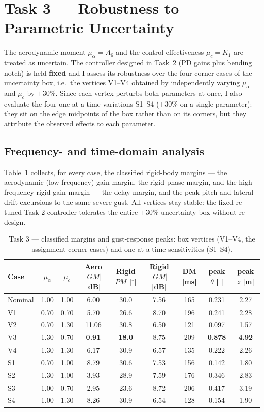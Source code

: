 \documentclass[../main.tex]{subfiles}
\begin{document}
\section{Task 3 --- Robustness to Parametric Uncertainty}\label{sec:task3}

The aerodynamic moment $\mu_\alpha = A_6$ and the control effectiveness
$\mu_c = K_1$ are treated as uncertain. The controller designed in Task~2
(PD gains plus bending notch) is held \textbf{fixed} and I assess its
robustness over the four corner cases of the uncertainty box, i.e.\ the
vertices V1--V4 obtained by independently varying $\mu_\alpha$ and $\mu_c$ by
$\pm 30\%$. Since each vertex perturbs both parameters at once, I also evaluate
the four one-at-a-time variations S1--S4 ($\pm 30\%$ on a single parameter):
they sit on the edge midpoints of the box rather than on its corners, but they
attribute the observed effects to each parameter.

\subsection{Frequency- and time-domain analysis}

Table~\ref{tab:corners} collects, for every case, the classified rigid-body
margins --- the aerodynamic (low-frequency) gain margin, the rigid phase margin,
and the high-frequency rigid gain margin --- the delay margin, and the peak pitch
and lateral-drift excursions to the same severe gust. All vertices stay stable:
the fixed re-tuned Task-2 controller tolerates the entire $\pm 30\%$ uncertainty
box without re-design.

\begin{table}[H]
\centering
\caption{Task 3 --- classified margins and gust-response peaks: box vertices
(V1--V4, the assignment corner cases) and one-at-a-time sensitivities (S1--S4).}
\label{tab:corners}
\footnotesize
\setlength{\tabcolsep}{3pt}
\begin{tabular}{lcccccccc}
\toprule
Case & $\mu_\alpha$ & $\mu_c$ & Aero $|GM|$ [dB] & Rigid $PM$ [$^\circ$] & Rigid $|GM|$ [dB] & DM [ms] & peak $\theta$ [$^\circ$] & peak $z$ [m] \\
\midrule
Nominal & 1.00 & 1.00 & 6.00  & 30.0 & 7.56 & 165 & 0.231 & 2.27 \\
\midrule
V1 & 0.70 & 0.70 & 5.70  & 26.6 & 8.70 & 196 & 0.241 & 2.28 \\
V2 & 0.70 & 1.30 & 11.06 & 30.8 & 6.50 & 121 & 0.097 & 1.57 \\
V3 & 1.30 & 0.70 & \textbf{0.91} & \textbf{18.0} & 8.75 & 209 & \textbf{0.878} & \textbf{4.92} \\
V4 & 1.30 & 1.30 & 6.17  & 30.9 & 6.57 & 135 & 0.222 & 2.26 \\
\midrule
S1 & 0.70 & 1.00 & 8.79  & 30.6 & 7.53 & 156 & 0.142 & 1.80 \\
S2 & 1.30 & 1.00 & 3.93  & 28.9 & 7.59 & 176 & 0.346 & 2.83 \\
S3 & 1.00 & 0.70 & 2.95  & 23.6 & 8.72 & 206 & 0.417 & 3.19 \\
S4 & 1.00 & 1.30 & 8.26  & 30.9 & 6.54 & 128 & 0.154 & 1.90 \\
\bottomrule
\end{tabular}
\end{table}
\end{document}
